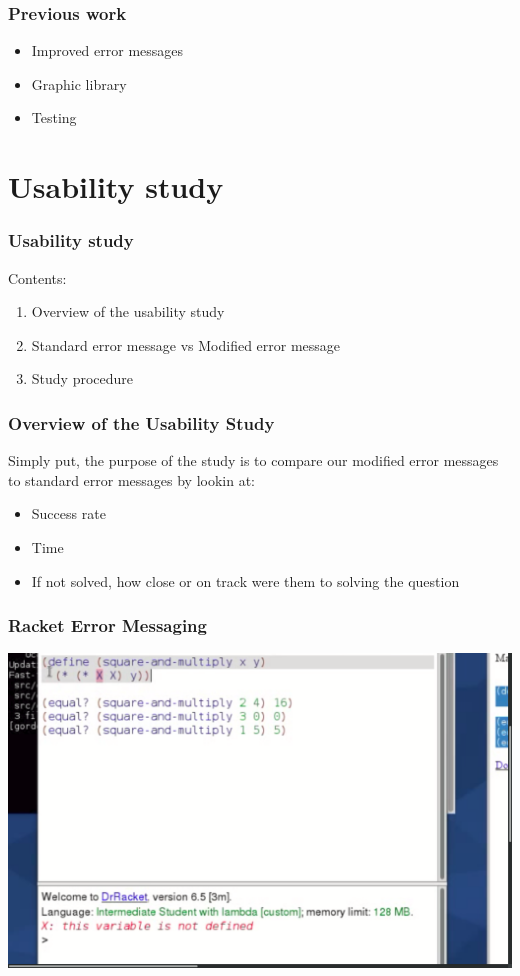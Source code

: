 \documentclass{beamer}
\begin{document}
\begin{frame}
	\frametitle{Previous work}
	\begin{itemize}
		\item Improved error messages
		\item Graphic library
		\item Testing
	\end{itemize}
\end{frame}





\section{Usability study}

\begin{frame}
  \frametitle{Usability study}
Contents:
\begin{enumerate}
\item Overview of the usability study 
\item Standard error message vs Modified error message
\item Study procedure
\end{enumerate}
\end{frame}


\begin{frame}
  \frametitle{Overview of the Usability Study}
Simply put, the purpose of the study is to compare our modified error messages to standard error messages by lookin at:
\begin{itemize}
\item Success rate
\item Time
\item If not solved, how close or on track were them to solving the question
\end{itemize} 
\end{frame}

\begin{frame}
  \frametitle{Racket Error Messaging}
  \includegraphics[scale=.17]{R2Rshot}
\end{frame}
\end{document}
